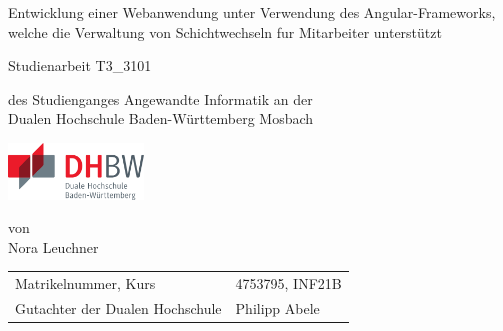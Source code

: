 \def\doctype{Dokumententyp}
\def\title{Entwicklung einer Webanwendung unter Verwendung des Angular-Frameworks,
welche die Verwaltung von Schichtwechseln fur Mitarbeiter unterstützt}
\def\author{Nora Leuchner}

\begin{titlepage}

	\vspace{10mm}

	\begin{center}
		\vspace{5mm}

		\huge \title

		\vspace{14.2pt}



		\vspace{42.6pt}

		\large Studienarbeit T3\_3101

		\vspace{42.6pt}

		\small des Studienganges Angewandte Informatik an der \\
		\large Dualen Hochschule Baden-Württemberg Mosbach

		\vspace{14.2pt}

		\includegraphics[height=1.5cm]{images/logo-dhbw.pdf}

		\vspace{42.6pt}

		\small von \\
		\large \author
	\end{center}

	\vspace{140pt}

	\begin{table}[h]
		\centering
		\begin{tabular}{ll}
			\small Matrikelnummer, Kurs            & 4753795, INF21B \\
			\small Gutachter der Dualen Hochschule & Philipp Abele   \\
		\end{tabular}
	\end{table}

	\vspace{49.7pt}


\end{titlepage}